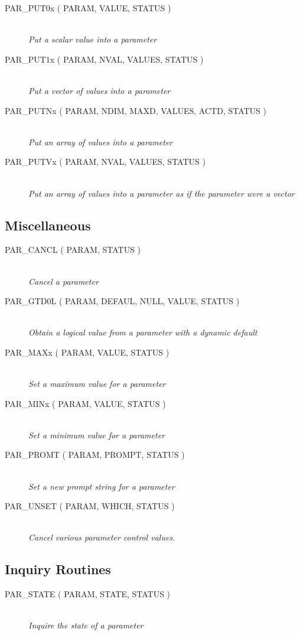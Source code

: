 \documentclass[twoside,11pt]{article}
\newcommand{\htmlref}[2]{#1}
\newcommand{\xlabel}[1]{}
\newcommand{\listline}{\hspace{1pt}\\}
\newcommand{\listline}{}
\begin{document}
\begin{description}
\item [\htmlref{PAR\_PUT0x}{PAR_PUT0x} 
( PARAM, VALUE, STATUS )] \listline
\textit{Put a scalar value into a parameter}
\item [\htmlref{PAR\_PUT1x}{PAR_PUT1x} 
( PARAM, NVAL, VALUES, STATUS )] \listline
\textit{Put a vector of values into a parameter}
\item [\htmlref{PAR\_PUTNx}{PAR_PUTNx} 
( PARAM, NDIM, MAXD, VALUES, ACTD, STATUS )] \listline
\textit{Put an array of values into a parameter}
\item [\htmlref{PAR\_PUTVx}{PAR_PUTVx} 
( PARAM, NVAL, VALUES, STATUS )] \listline
\textit{Put an array of values into a parameter as if the parameter were a
            vector}
\end{description}

\subsection{\xlabel{miscellaneous}Miscellaneous}

\begin{description}
\item [\htmlref{PAR\_CANCL}{PAR_CANCL} 
( PARAM, STATUS )] \listline
\textit{Cancel a parameter}
\item [\htmlref{PAR\_GTD0L}{PAR_GTD0L} 
( PARAM, DEFAUL, NULL, VALUE, STATUS )] \listline
\textit{Obtain a logical value from a parameter with a dynamic default}
\item [\htmlref{PAR\_MAXx}{PAR_MAXx} 
( PARAM, VALUE, STATUS )] \listline
\textit{Set a maximum value for a parameter}
\item [\htmlref{PAR\_MINx}{PAR_MINx} 
( PARAM, VALUE, STATUS )] \listline
\textit{Set a minimum value for a parameter}
\item [\htmlref{PAR\_PROMT}{PAR_PROMT} 
( PARAM, PROMPT, STATUS )] \listline
\textit{Set a new prompt string for a parameter}
\item [\htmlref{PAR\_UNSET}{PAR_UNSET} 
( PARAM, WHICH, STATUS )] \listline
\textit{Cancel various parameter control values.}
\end{description}

\subsection{\xlabel{inquiry_routines}Inquiry Routines}

\begin{description}
\item [\htmlref{PAR\_STATE}{PAR_STATE} 
( PARAM, STATE, STATUS )] \listline
\textit{Inquire the state of a parameter}
\end{description}
\end{document}
